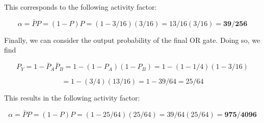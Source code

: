 \documentclass[fleqn]{article}
\begin{document}
\begin{enumerate}
\begin{enumerate}
			This corresponds to the following activity factor:
			
			\begin{equation*}
				\alpha = \bar{P}P = (1 - P)P = (1 - 3/16)(3/16) = 13/16(3/16) = \mathbf{39/256}
			\end{equation*}
			
			Finally, we can consider the output probability of the final OR gate. Doing so, we find
			
			\begin{equation*}
				P_Y = 1 - \bar{P}_A\bar{P}_B = 1 - (1 - P_A)(1 - P_B) = 1 - (1 - 1/4)(1 - 3/16) 
			\end{equation*}
			
			\begin{equation*}
				= 1 - (3/4)(13/16) = 1 - 39/64 = 25/64
			\end{equation*}
			
			This results in the following activity factor:
			
			\begin{equation*}
				\alpha = \bar{P}P = (1 - P)P = (1 - 25/64)(25/64) = 39/64(25/64) = \mathbf{975/4096}
			\end{equation*}
			
		\end{enumerate}
	\end{enumerate}
\end{document}
